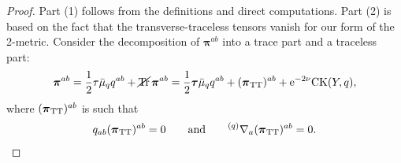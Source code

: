 \documentclass[pdftex]{sigma}
\def\mbo#1{\boldsymbol{#1}}%
\def\grad{{\nabla}}%
\newcommand{\leftexp}[2]{{\vphantom{#2}}^{#1}{#2}}
\def\halb{\frac{1}{2}}%
\numberwithin{equation}{section}
\begin{document}
\begin{proof}
Part (1) follows from the definitions and direct computations. Part (2) is based on the fact that the transverse-traceless tensors vanish for our form of the 2-metric. Consider the decomposition of $\mbo{\pi}^{ab}$ into a trace part and a traceless part:
\begin{align} \label{split-pi}
\mbo{\pi}^{ab} = \halb \tau \bar{\mu}_q q^{ab} + \cancel{\operatorname{Tr}} \, \mbo{\pi}^{ab}
= \halb \mbo{\tau} \bar{\mu}_q q^{ab} + (\mbo{\pi}_{{\rm TT}})^{ab} + {\rm e}^{-2\nu} {\rm CK} (Y, q),
\end{align}
where $(\mbo{\pi}_{{\rm TT}})^{ab}$ is such that
\begin{align} \label{tt-cond}
q_{ab} (\mbo{\pi}_{{\rm TT}})^{ab} =0 \qquad \text{and} \qquad \leftexp{(q)}{\grad}_a (\mbo{\pi}_{{\rm TT}})^{ab} =0.
\end{align}


\end{proof}
\end{document}
